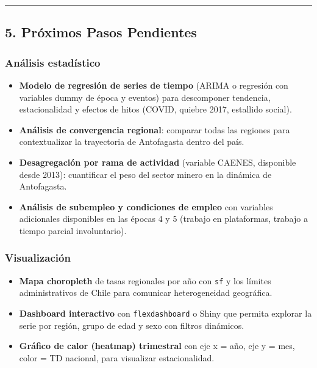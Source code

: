 \documentclass[
]{article}
\providecommand{\tightlist}{%
  \setlength{\itemsep}{0pt}\setlength{\parskip}{0pt}}
\begin{document}
\begin{center}\rule{0.5\linewidth}{0.5pt}\end{center}

\subsection{5. Próximos Pasos
Pendientes}\label{pruxf3ximos-pasos-pendientes}

\subsubsection{Análisis estadístico}\label{anuxe1lisis-estaduxedstico}

\begin{itemize}
\tightlist
\item[$\square$]
  \textbf{Modelo de regresión de series de tiempo} (ARIMA o regresión
  con variables dummy de época y eventos) para descomponer tendencia,
  estacionalidad y efectos de hitos (COVID, quiebre 2017, estallido
  social).
\item[$\square$]
  \textbf{Análisis de convergencia regional}: comparar todas las
  regiones para contextualizar la trayectoria de Antofagasta dentro del
  país.
\item[$\square$]
  \textbf{Desagregación por rama de actividad} (variable CAENES,
  disponible desde 2013): cuantificar el peso del sector minero en la
  dinámica de Antofagasta.
\item[$\square$]
  \textbf{Análisis de subempleo y condiciones de empleo} con variables
  adicionales disponibles en las épocas 4 y 5 (trabajo en plataformas,
  trabajo a tiempo parcial involuntario).
\end{itemize}

\subsubsection{Visualización}\label{visualizaciuxf3n}

\begin{itemize}
\tightlist
\item[$\square$]
  \textbf{Mapa choropleth} de tasas regionales por año con \texttt{sf} y
  los límites administrativos de Chile para comunicar heterogeneidad
  geográfica.
\item[$\square$]
  \textbf{Dashboard interactivo} con \texttt{flexdashboard} o Shiny que
  permita explorar la serie por región, grupo de edad y sexo con filtros
  dinámicos.
\item[$\square$]
  \textbf{Gráfico de calor (heatmap) trimestral} con eje x = año, eje y
  = mes, color = TD nacional, para visualizar estacionalidad.
\end{itemize}
\end{document}
